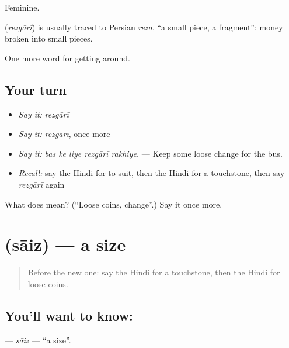 Feminine.

\begin{cousinweb}
\textbf{} (\emph{rezgārī}) is usually traced to Persian \emph{reza}, \textquotedblleft{}a small piece, a fragment\textquotedblright{}: money broken into small pieces.
\end{cousinweb}

\begin{grammarlens}[title={What you've built}]
One more word for getting around.
\end{grammarlens}

\subsection*{Your turn}
\begin{itemize}
\raggedright
  \item \emph{Say it:} \emph{rezgārī}
  \item \emph{Say it:} \emph{rezgārī}, once more
  \item \emph{Say it:} \emph{bas ke liye rezgārī rakhiye.} — Keep some loose change for the bus.
  \item \emph{Recall:} say the Hindi for to suit, then the Hindi for a touchstone, then say \emph{rezgārī} again
\end{itemize}

\begin{tcolorbox}[breakable,colback=teal!4,colframe=teal!35!black,title={Before you move on}]
What does  mean? (\textquotedblleft{}Loose coins, change\textquotedblright{}.) Say it once more.
\end{tcolorbox}
\section[\texorpdfstring{\hi{साइज़} (sāiz)}{साइज़ (sāiz)}]{ (sāiz) — a size}

\label{lesson:HI-C435-saiz}



\begin{quote}
Before the new one: say the Hindi for a touchstone, then the Hindi for loose coins.
\end{quote}

\subsection*{You'll want to know: }
\textbf{} — \emph{sāiz} — \textquotedblleft{}a size\textquotedblright{}.


